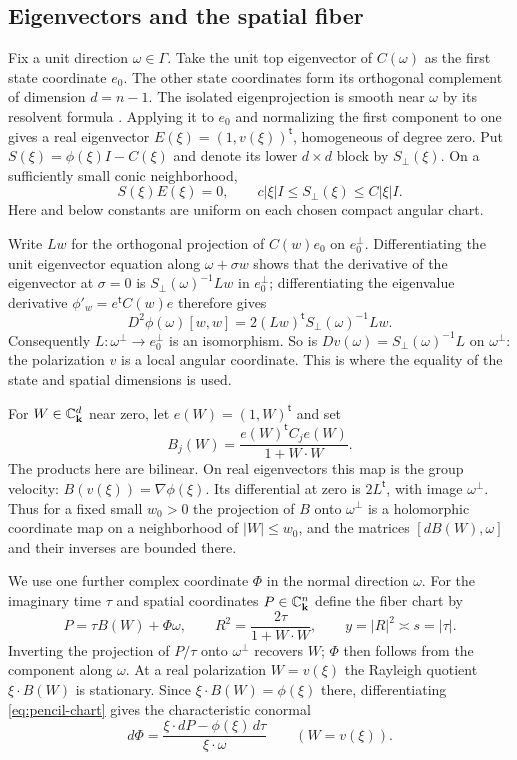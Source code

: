 \subsection{Eigenvectors and the spatial fiber}

Fix a unit direction $\omega\in\Gamma$. Take the unit top eigenvector of
$C(\omega)$ as the first state coordinate $e_0$. The other state coordinates
form its orthogonal complement of dimension $d=n-1$. The isolated
eigenprojection is smooth near $\omega$ by its resolvent formula
\cite[Chapter~II]{Kato1995}. Applying it to $e_0$ and normalizing the first
component to one gives a real eigenvector
$E(\xi)=(1,v(\xi))^{\mathsf t}$, homogeneous of degree zero. Put
$S(\xi)=\phi(\xi)I-C(\xi)$ and denote its lower $d\times d$ block by
$S_\perp(\xi)$. On a sufficiently small conic neighborhood,
\[
 S(\xi)E(\xi)=0,\qquad c|\xi|I\le S_\perp(\xi)\le C|\xi|I .
\]
Here and below constants are uniform on each chosen compact angular chart.

Write $Lw$ for the orthogonal projection of $C(w)e_0$ on $e_0^\perp$.
Differentiating the unit eigenvector equation along $\omega+\sigma w$
shows that the derivative of the eigenvector at $\sigma=0$ is
$S_\perp(\omega)^{-1}Lw$ in $e_0^\perp$; differentiating the eigenvalue
derivative $\phi'_w=e^{\mathsf t}C(w)e$ therefore gives
\begin{equation}\label{eq:pencil-curvature}
 D^2\phi(\omega)[w,w]
    =2(Lw)^{\mathsf t}S_\perp(\omega)^{-1}Lw.
\end{equation}
Consequently $L:\omega^\perp\to e_0^\perp$ is an isomorphism. So is
$Dv(\omega)=S_\perp(\omega)^{-1}L$ on $\omega^\perp$: the polarization
$v$ is a local angular coordinate. This is where the equality of the
state and spatial dimensions is used.

For $W\in\mathbb C_{\mathbf k}^d$ near zero, let $e(W)=(1,W)^{\mathsf t}$ and set
\[
 B_j(W)=\frac{e(W)^{\mathsf t} C_j e(W)}{1+W\cdot W}.
\]
The products here are bilinear. On real eigenvectors this map is the group
velocity: $B(v(\xi))=\nabla\phi(\xi)$. Its differential at zero is
$2L^{\mathsf t}$, with image $\omega^\perp$. Thus for a fixed small $w_0>0$
the projection of $B$ onto $\omega^\perp$ is a holomorphic coordinate map
on a neighborhood of $|W|\le w_0$, and the matrices $[dB(W),\omega]$
and their inverses are bounded there.

We use one further complex coordinate $\Phi$ in the normal direction
$\omega$. For the imaginary time $\tau$ and spatial coordinates
$P\in\mathbb C_{\mathbf k}^n$ define the fiber chart by
\begin{equation}\label{eq:pencil-chart}
 P=\tau B(W)+\Phi\omega,\qquad
 R^2=\frac{2\tau}{1+W\cdot W},\qquad y=|R|^2\asymp s=|\tau|.
\end{equation}
Inverting the projection of $P/\tau$ onto $\omega^\perp$ recovers $W$;
$\Phi$ then follows from the component along $\omega$. At a real
polarization $W=v(\xi)$ the Rayleigh quotient $\xi\cdot B(W)$ is
stationary. Since $\xi\cdot B(W)=\phi(\xi)$ there, differentiating
\eqref{eq:pencil-chart} gives the characteristic conormal
\[
 d\Phi=\frac{\xi\cdot dP-\phi(\xi)\,d\tau}{\xi\cdot\omega}
 \qquad(W=v(\xi)).
\]

